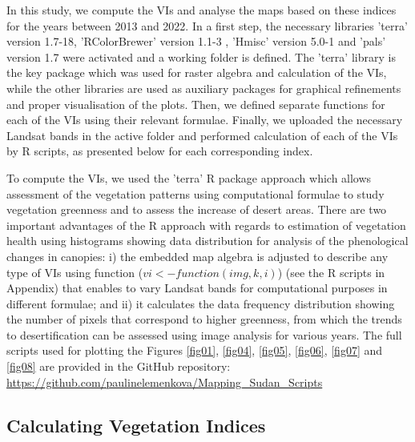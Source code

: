 \documentclass[jimaging,article,submit,pdftex,moreauthors]{Definitions/mdpi}
\begin{document}
In this study, we compute the VIs and analyse the maps based on these indices for the years between 2013 and 2022. In a first step, the necessary libraries 'terra' version 1.7-18, 'RColorBrewer' version 1.1-3 \cite{Neuwirth}, 'Hmisc' version 5.0-1 \cite{Hmisc} and 'pals' version 1.7 \cite{Wright} were activated and a working folder is defined. The 'terra' library is the key package which was used for raster algebra and calculation of the VIs, while the other libraries are used as auxiliary packages for graphical refinements and proper visualisation of the plots. Then, we defined separate functions for each of the VIs using their relevant formulae. Finally, we uploaded the necessary Landsat bands in the active folder and performed calculation of each of the VIs by R scripts, as presented below for each corresponding index.

To compute the VIs, we used the 'terra' R package approach which allows assessment of the vegetation patterns using computational formulae to study vegetation greenness and to assess the increase of desert areas. There are two important advantages of the R approach with regards to estimation of vegetation health using histograms showing data distribution for analysis of the phenological changes in canopies: i) the embedded map algebra is adjusted to describe any type of VIs using function ($vi <- function(img, k, i)$) (see the R scripts in Appendix) that enables to vary Landsat bands for computational purposes in different formulae; and ii) it calculates the data frequency distribution showing the number of pixels that correspond to higher greenness, from which the trends to desertification can be assessed using image analysis for various years. The full scripts used for plotting the Figures \ref{fig01}, \ref{fig04}, \ref{fig05}, \ref{fig06}, \ref{fig07} and \ref{fig08} are provided in the GitHub repository: \href{https://github.com/paulinelemenkova/Mapping_Sudan_Scripts}{https://github.com/paulinelemenkova/Mapping\_Sudan\_Scripts}

\subsection{Calculating Vegetation Indices}
\end{document}
